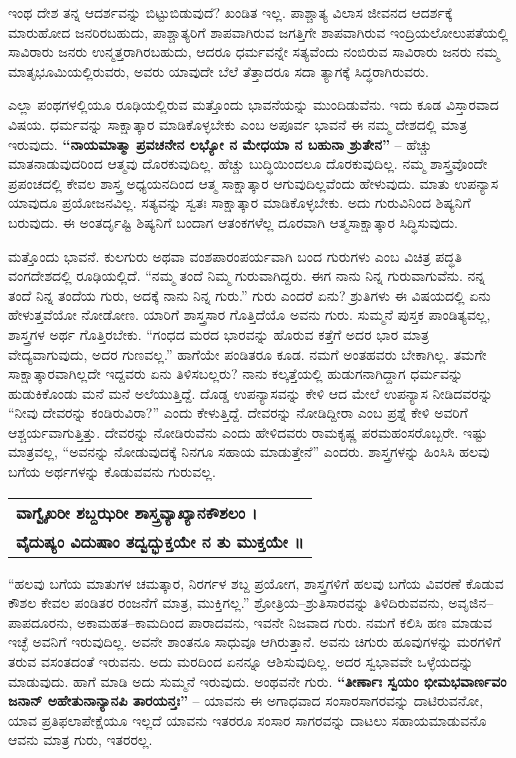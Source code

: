 ಇಂಥ ದೇಶ ತನ್ನ ಆದರ್ಶವನ್ನು ಬಿಟ್ಟುಬಿಡುವುದೆ? ಖಂಡಿತ ಇಲ್ಲ. ಪಾಶ್ಚಾತ್ಯ ವಿಲಾಸ ಜೀವನದ ಆದರ್ಶಕ್ಕೆ ಮಾರುಹೋದ ಜನರಿರಬಹುದು, ಪಾಶ್ಚಾತ್ಯರಿಗೆ ಶಾಪವಾಗಿರುವ ಜಗತ್ತಿಗೇ ಶಾಪವಾಗಿರುವ ಇಂದ್ರಿಯಲೋಲುಪತೆಯಲ್ಲಿ ಸಾವಿರಾರು ಜನರು ಉನ್ಮತ್ತರಾಗಿರಬಹುದು, ಆದರೂ ಧರ್ಮವನ್ನೇ ಸತ್ಯವೆಂದು ನಂಬಿರುವ ಸಾವಿರಾರು ಜನರು ನಮ್ಮ ಮಾತೃಭೂಮಿಯಲ್ಲಿರುವರು, ಅವರು ಯಾವುದೇ ಬೆಲೆ ತೆತ್ತಾದರೂ ಸದಾ ತ್ಯಾಗಕ್ಕೆ ಸಿದ್ಧರಾಗಿರುವರು.

ಎಲ್ಲಾ ಪಂಥಗಳಲ್ಲಿಯೂ ರೂಢಿಯಲ್ಲಿರುವ ಮತ್ತೊಂದು ಭಾವನೆಯನ್ನು ಮುಂದಿಡುವೆನು. ಇದು ಕೂಡ ವಿಸ್ತಾರವಾದ ವಿಷಯ. ಧರ್ಮವನ್ನು ಸಾಕ್ಷಾತ್ಕಾರ ಮಾಡಿಕೊಳ್ಳಬೇಕು ಎಂಬ ಅಪೂರ್ವ ಭಾವನೆ ಈ ನಮ್ಮ ದೇಶದಲ್ಲಿ ಮಾತ್ರ ಇರುವುದು. \textbf{“ನಾಯಮಾತ್ಮಾ ಪ್ರವಚನೇನ ಲಭ್ಯೋ ನ ಮೇಧಯಾ ನ ಬಹುನಾ ಶ್ರುತೇನ”} – ಹೆಚ್ಚು ಮಾತನಾಡುವುದರಿಂದ ಆತ್ಮವು ದೊರಕುವುದಿಲ್ಲ. ಹೆಚ್ಚು ಬುದ್ಧಿಯಿಂದಲೂ ದೊರಕುವುದಿಲ್ಲ. ನಮ್ಮ ಶಾಸ್ತ್ರವೊಂದೇ ಪ್ರಪಂಚದಲ್ಲಿ ಕೇವಲ ಶಾಸ್ತ್ರ ಅಧ್ಯಯನದಿಂದ ಆತ್ಮ ಸಾಕ್ಷಾತ್ಕಾರ ಆಗುವುದಿಲ್ಲವೆಂದು ಹೇಳುವುದು. ಮಾತು ಉಪನ್ಯಾಸ ಯಾವುದೂ ಪ್ರಯೋಜನವಿಲ್ಲ. ಸತ್ಯವನ್ನು ಸ್ವತಃ ಸಾಕ್ಷಾತ್ಕಾರ ಮಾಡಿಕೊಳ್ಳಬೇಕು. ಅದು ಗುರುವಿನಿಂದ ಶಿಷ್ಯನಿಗೆ ಬರುವುದು. ಈ ಅಂತರ್ದೃಷ್ಟಿ ಶಿಷ್ಯನಿಗೆ ಬಂದಾಗ ಆತಂಕಗಳೆಲ್ಲ ದೂರವಾಗಿ ಆತ್ಮಸಾಕ್ಷಾತ್ಕಾರ ಸಿದ್ಧಿಸುವುದು.

ಮತ್ತೊಂದು ಭಾವನೆ. ಕುಲಗುರು ಅಥವಾ ವಂಶಪಾರಂಪರ್ಯವಾಗಿ ಬಂದ ಗುರುಗಳು ಎಂಬ ವಿಚಿತ್ರ ಪದ್ಧತಿ ವಂಗದೇಶದಲ್ಲಿ ರೂಢಿಯಲ್ಲಿದೆ. “ನಮ್ಮ ತಂದೆ ನಿಮ್ಮ ಗುರುವಾಗಿದ್ದರು. ಈಗ ನಾನು ನಿನ್ನ ಗುರುವಾಗುವೆನು. ನನ್ನ ತಂದೆ ನಿನ್ನ ತಂದೆಯ ಗುರು, ಅದಕ್ಕೆ ನಾನು ನಿನ್ನ ಗುರು.” ಗುರು ಎಂದರೆ ಏನು? ಶ್ರುತಿಗಳು ಈ ವಿಷಯದಲ್ಲಿ ಏನು ಹೇಳುತ್ತವೆಯೋ ನೋಡೋಣ. ಯಾರಿಗೆ ಶಾಸ್ತ್ರಸಾರ ಗೊತ್ತಿದೆಯೊ ಅವನು ಗುರು. ಸುಮ್ಮನೆ ಪುಸ್ತಕ ಪಾಂಡಿತ್ಯವಲ್ಲ, ಶಾಸ್ತ್ರಗಳ ಅರ್ಥ ಗೊತ್ತಿರಬೇಕು. “ಗಂಧದ ಮರದ ಭಾರವನ್ನು ಹೊರುವ ಕತ್ತೆಗೆ ಅದರ ಭಾರ ಮಾತ್ರ ವೇದ್ಯವಾಗುವುದು, ಅದರ ಗುಣವಲ್ಲ.” ಹಾಗೆಯೇ ಪಂಡಿತರೂ ಕೂಡ. ನಮಗೆ ಅಂತಹವರು ಬೇಕಾಗಿಲ್ಲ. ತಮಗೇ ಸಾಕ್ಷಾತ್ಕಾರವಾಗಿಲ್ಲದೇ ಇದ್ದವರು ಏನು ತಿಳಿಸಬಲ್ಲರು? ನಾನು ಕಲ್ಕತ್ತೆಯಲ್ಲಿ ಹುಡುಗನಾಗಿದ್ದಾಗ ಧರ್ಮವನ್ನು ಹುಡುಕಿಕೊಂಡು ಮನೆ ಮನೆ ಅಲೆಯುತ್ತಿದ್ದೆ. ದೊಡ್ಡ ಉಪನ್ಯಾಸವನ್ನು ಕೇಳಿ ಆದ ಮೇಲೆ ಉಪನ್ಯಾಸ ನೀಡಿದವರನ್ನು “ನೀವು ದೇವರನ್ನು ಕಂಡಿರುವಿರಾ?” ಎಂದು ಕೇಳುತ್ತಿದ್ದೆ. ದೇವರನ್ನು ನೋಡಿದ್ದೀರಾ ಎಂಬ ಪ್ರಶ್ನೆ ಕೇಳಿ ಅವರಿಗೆ ಆಶ್ಚರ್ಯವಾಗುತ್ತಿತ್ತು. ದೇವರನ್ನು ನೋಡಿರುವೆನು ಎಂದು ಹೇಳಿದವರು ರಾಮಕೃಷ್ಣ ಪರಮಹಂಸರೊಬ್ಬರೇ. ಇಷ್ಟು ಮಾತ್ರವಲ್ಲ, “ಅವನನ್ನು ನೋಡುವುದಕ್ಕೆ ನಿನಗೂ ಸಹಾಯ ಮಾಡುತ್ತೇನೆ” ಎಂದರು. ಶಾಸ್ತ್ರಗಳನ್ನು ಹಿಂಸಿಸಿ ಹಲವು ಬಗೆಯ ಅರ್ಥಗಳನ್ನು ಕೊಡುವವನು ಗುರುವಲ್ಲ.

\begin{longtable}[c]{@{}l@{}}
\textbf{{\small ವಾಗ್ವೈಖರೀ ಶಬ್ದಝರೀ ಶಾಸ್ತ್ರವ್ಯಾಖ್ಯಾನಕೌಶಲಂ ।}} \\
\textbf{{\small ವೈದುಷ್ಯಂ ವಿದುಷಾಂ ತದ್ವದ್ಭುಕ್ತಯೇ ನ ತು ಮುಕ್ತಯೇ ॥}} \\
\end{longtable}

“ಹಲವು ಬಗೆಯ ಮಾತುಗಳ ಚಮತ್ಕಾರ, ನಿರರ್ಗಳ ಶಬ್ದ ಪ್ರಯೋಗ, ಶಾಸ್ತ್ರಗಳಿಗೆ ಹಲವು ಬಗೆಯ ವಿವರಣೆ ಕೊಡುವ ಕೌಶಲ ಕೇವಲ ಪಂಡಿತರ ರಂಜನೆಗೆ ಮಾತ್ರ, ಮುಕ್ತಿಗಲ್ಲ.” ಶ್ರೋತ್ರಿಯ–ಶ್ರುತಿಸಾರವನ್ನು ತಿಳಿದಿರುವವನು, ಅವೃಜಿನ–ಪಾಪದೂರನು, ಅಕಾಮಹತ–ಕಾಮದಿಂದ ಪಾರಾದವನು, ಇವನೇ ನಿಜವಾದ ಗುರು. ನಮಗೆ ಕಲಿಸಿ ಹಣ ಮಾಡುವ ಇಚ್ಛೆ ಅವನಿಗೆ ಇರುವುದಿಲ್ಲ. ಅವನೇ ಶಾಂತನೂ ಸಾಧುವೂ ಆಗಿರುತ್ತಾನೆ. ಅವನು ಚಿಗುರು ಹೂವುಗಳನ್ನು ಮರಗಳಿಗೆ ತರುವ ವಸಂತದಂತೆ ಇರುವನು. ಅದು ಮರದಿಂದ ಏನನ್ನೂ ಆಶಿಸುವುದಿಲ್ಲ. ಅದರ ಸ್ವಭಾವವೇ ಒಳ್ಳೆಯದನ್ನು ಮಾಡುವುದು. ಹಾಗೆ ಮಾಡಿ ಅದು ಸುಮ್ಮನೆ ಇರುವುದು. ಅಂಥವನೇ ಗುರು. \textbf{“ತೀರ್ಣಾಃ ಸ್ವಯಂ ಭೀಮಭವಾರ್ಣವಂ ಜನಾನ್​ ಅಹೇತುನಾನ್ಯಾನಪಿ ತಾರಯನ್ತಃ”} – ಯಾವನು ಈ ಅಗಾಧವಾದ ಸಂಸಾರಸಾಗರವನ್ನು ದಾಟಿರುವನೋ, ಯಾವ ಪ್ರತಿಫಲಾಪೇಕ್ಷೆಯೂ ಇಲ್ಲದೆ ಯಾವನು ಇತರರೂ ಸಂಸಾರ ಸಾಗರವನ್ನು ದಾಟಲು ಸಹಾಯಮಾಡುವನೊ ಆವನು ಮಾತ್ರ ಗುರು, ಇತರರಲ್ಲ.

